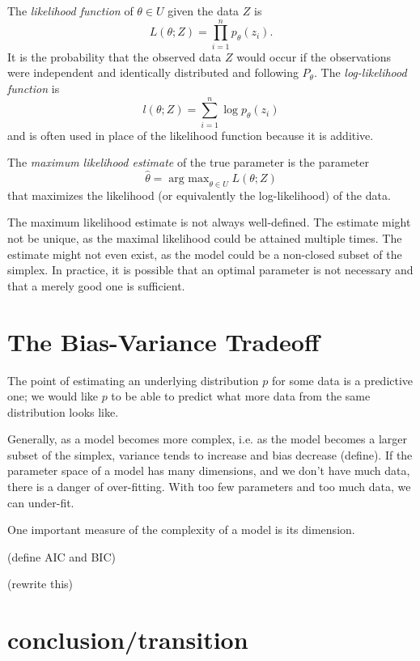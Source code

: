 \documentclass[cclicense]{hmcthesis}
\DeclareMathOperator*{\argmax}{arg\ max}
\numberwithin{equation}{chapter}
\numberwithin{thmcounter}{chapter}
\begin{document}
    \begin{definition}
    The \emph{likelihood function} of $\theta \in U$ given the data $Z$ is
    \[
        L(\theta; Z) = \prod_{i=1}^n p_\theta(z_i).
    \]
    It is the probability that the observed data $Z$ would occur if the
    observations were independent and identically distributed and following
    $P_\theta$.  The \emph{log-likelihood function} is
    \[
        l(\theta; Z) = \sum_{i=1}^n \log p_\theta(z_i)
    \]
    and is often used in place of the likelihood function because it is additive.
    \end{definition}
    \begin{definition}
    The \emph{maximum likelihood estimate} of the true parameter is the
    parameter 
    \[
        \hat \theta = \argmax_{\theta \in U} L(\theta; Z)
    \]
    that maximizes the likelihood (or equivalently the log-likelihood) of the
    data.
    \end{definition}

    The maximum likelihood estimate is not always well-defined.  The estimate
    might not be unique, as the maximal likelihood could be attained multiple
    times.  The estimate  might not even exist, as the model could be a
    non-closed subset of the simplex.  In practice, it is possible that an
    optimal parameter is not necessary and that a merely good one is sufficient.

\section{The Bias-Variance Tradeoff}
    
    The point of estimating an underlying distribution $p$ for some data is a
    predictive one; we would like $p$ to be able to predict what more data from
    the same distribution looks like.

    Generally, as a model becomes more complex, i.e. as the model becomes a
    larger subset of the simplex, variance tends to increase and bias decrease
    (define).  If the parameter space of a model has many dimensions, and we
    don't have much data, there is a danger of over-fitting.  With too few
    parameters and too much data, we can under-fit.


    One important measure of the complexity of a model is its dimension.

    (define AIC and BIC)

    (rewrite this)

\section{conclusion/transition}
    
\end{document}
